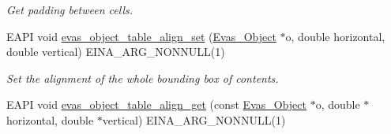 \begin{DoxyCompactItemize}
\begin{DoxyCompactList}\small\item\em Get padding between cells. \item\end{DoxyCompactList}\item 
EAPI void \hyperlink{group__Evas__Object__Table_ga7299bcee8de1f9304fa31fff43347a45}{evas\_\-object\_\-table\_\-align\_\-set} (\hyperlink{group__Evas__Object__Group_ga9e19e6dd1f517a0ba437c0114d3e7c97}{Evas\_\-Object} $\ast$o, double horizontal, double vertical) EINA\_\-ARG\_\-NONNULL(1)\label{group__Evas__Object__Table_ga7299bcee8de1f9304fa31fff43347a45}

\begin{DoxyCompactList}\small\item\em Set the alignment of the whole bounding box of contents. \item\end{DoxyCompactList}\item 
EAPI void \hyperlink{group__Evas__Object__Table_ga7a1ff64522920c2723675ca11d723d47}{evas\_\-object\_\-table\_\-align\_\-get} (const \hyperlink{group__Evas__Object__Group_ga9e19e6dd1f517a0ba437c0114d3e7c97}{Evas\_\-Object} $\ast$o, double $\ast$horizontal, double $\ast$vertical) EINA\_\-ARG\_\-NONNULL(1)\label{group__Evas__Object__Table_ga7a1ff64522920c2723675ca11d723d47}


\end{DoxyCompactItemize}
